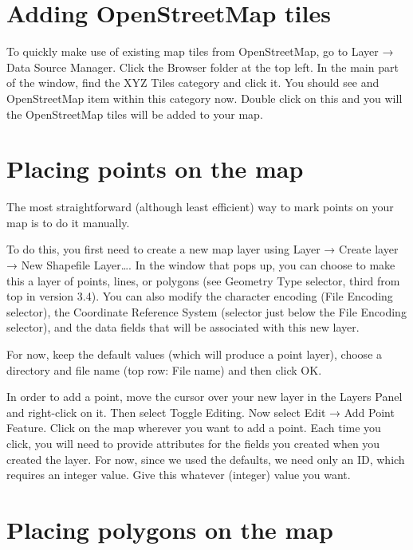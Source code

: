 \documentclass[]{book}
\begin{document}
\hypertarget{osm-tiles}{%
\section{Adding OpenStreetMap tiles}\label{osm-tiles}}

To quickly make use of existing map tiles from OpenStreetMap, go to Layer → Data Source Manager. Click the Browser folder at the top left. In the main part of the window, find the XYZ Tiles category and click it. You should see and OpenStreetMap item within this category now. Double click on this and you will the OpenStreetMap tiles will be added to your map.

\hypertarget{placing-points-on-the-map}{%
\section{Placing points on the map}\label{placing-points-on-the-map}}

The most straightforward (although least efficient) way to mark points on your map is to do it manually.

To do this, you first need to create a new map layer using Layer → Create layer → New Shapefile Layer\ldots{}. In the window that pops up, you can choose to make this a layer of points, lines, or polygons (see Geometry Type selector, third from top in version 3.4). You can also modify the character encoding (File Encoding selector), the Coordinate Reference System (selector just below the File Encoding selector), and the data fields that will be associated with this new layer.

For now, keep the default values (which will produce a point layer), choose a directory and file name (top row: File name) and then click OK.

In order to add a point, move the cursor over your new layer in the Layers Panel and right-click on it. Then select Toggle Editing. Now select Edit → Add Point Feature. Click on the map wherever you want to add a point. Each time you click, you will need to provide attributes for the fields you created when you created the layer. For now, since we used the defaults, we need only an ID, which requires an integer value. Give this whatever (integer) value you want.

\hypertarget{placing-polygons-on-the-map}{%
\section{Placing polygons on the map}\label{placing-polygons-on-the-map}}
\end{document}
